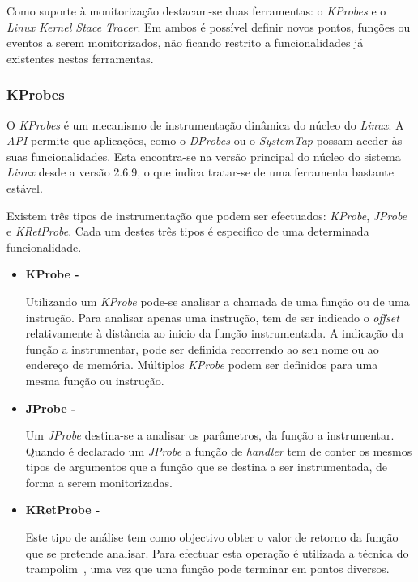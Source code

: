 Como suporte à monitorização destacam-se duas ferramentas: o \textit{KProbes} e o \textit{Linux Kernel Stace Tracer}.
Em ambos é possível definir novos pontos, funções ou eventos a serem monitorizados, não ficando restrito a funcionalidades já existentes nestas ferramentas.

\subsubsection{KProbes}\label{sect:KProbes_overview}

O \textit{KProbes} é um mecanismo de instrumentação dinâmica do núcleo do \textit{Linux}.
A \textit{API} permite que aplicações, como o \textit{DProbes} ou o \textit{SystemTap} possam aceder às suas funcionalidades.
Esta encontra-se na versão principal do núcleo do sistema \textit{Linux} desde a versão 2.6.9, o que indica tratar-se de uma ferramenta bastante estável\cite{kernel_debug_printk_on_fly,KProbesSite}.

Existem três tipos de instrumentação que podem ser efectuados: \textit{KProbe}, \textit{JProbe} e \textit{KRetProbe}.
Cada um destes três tipos é especifico de uma determinada funcionalidade.

\begin{itemize}
 \item \textbf{KProbe - }

Utilizando um \textit{KProbe} pode-se analisar a chamada de uma função ou de uma instrução.
Para analisar apenas uma instrução, tem de ser indicado o \textit{offset} relativamente à distância ao inicio da função instrumentada.
A indicação da função a instrumentar, pode ser definida recorrendo ao seu nome ou ao endereço de memória.
Múltiplos \textit{KProbe} podem ser definidos para uma mesma função ou instrução.

\item \textbf{JProbe - }

Um \textit{JProbe} destina-se a analisar os parâmetros, da função a instrumentar.
Quando é declarado um \textit{JProbe} a função de \textit{handler} tem de conter os mesmos tipos de argumentos que a função que se destina a ser instrumentada, de forma a serem monitorizadas.
 
 \item \textbf{KRetProbe - }

Este tipo de análise tem como objectivo obter o valor de retorno da função que se pretende analisar.
Para efectuar esta operação é utilizada a técnica do trampolim~\cite{Hollingsworth94dynamicprogram}, uma vez que uma função pode terminar em pontos diversos.

\end{itemize}

